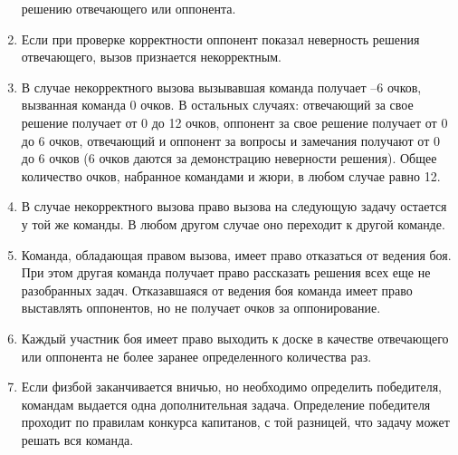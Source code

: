 \documentclass[11pt]{article}
\begin{document}
\begin{enumerate}
  решению отвечающего или оппонента.
\item Если при проверке корректности оппонент показал неверность
  решения отвечающего, вызов признается некорректным.
\item В случае некорректного вызова вызывавшая команда получает –6
  очков, вызванная команда 0 очков. В остальных случаях: отвечающий за
  свое решение получает от 0 до 12 очков, оппонент за свое решение
  получает от 0 до 6 очков, отвечающий и оппонент за вопросы и
  замечания получают от 0 до 6 очков (6 очков даются за демонстрацию
  неверности решения). Общее количество очков, набранное командами и
  жюри, в любом случае равно 12.
\item В случае некорректного вызова право вызова на следующую задачу
  остается у той же команды. В любом другом случае оно переходит к
  другой команде.
\item Команда, обладающая правом вызова, имеет право отказаться от
  ведения боя. При этом другая команда получает право рассказать
  решения всех еще не разобранных задач. Отказавшаяся от ведения боя
  команда имеет право выставлять оппонентов, но не получает очков за
  оппонирование.
\item Каждый участник боя имеет право выходить к доске в качестве
  отвечающего или оппонента не более заранее определенного количества
  раз.
\item Если физбой заканчивается вничью, но необходимо определить
  победителя, командам выдается одна дополнительная
  задача. Определение победителя проходит по правилам конкурса
  капитанов, с той разницей, что задачу может решать вся команда.
\end{enumerate}
\end{document}
